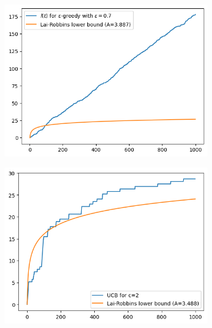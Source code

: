 \begin{figure}[ht]
\begin{subfigure}{0.45}
    \end{subfigure} 
    \begin{subfigure}{0.45}
        \centering
        \includegraphics[scale=0.5]{figures/e07.png}
    \end{subfigure} 
    \begin{subfigure}{0.45}
        \centering
        \includegraphics[scale=0.5]{figures/ucb.png}
    \end{subfigure}   
\end{figure}

